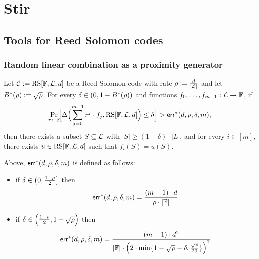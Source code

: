 
\section{Stir}

\subsection{Tools for Reed Solomon codes}
\subsubsection{Random linear combination as a proximity generator}\label{sec:proximity_gap}

\begin{theorem}\label{thm:proximity_gap}
    Let $\mathcal{C} := \mathrm{RS}[\mathbb{F},\mathcal{L},d]$ be a Reed Solomon code with rate $\rho:=\frac{d}{|\mathcal{L}|}$ and let $B^*(\rho):=\sqrt{\rho}$. For every $\delta \in (0,1 - B^*(\rho))$ and functions $f_0,\ldots,f_{m-1} : \mathcal{L} \to \mathbb{F}$, if
    \[
    \Pr_{r\leftarrow\mathbb{F}}\!\Bigl[
      \Delta\Bigl(\sum_{j=0}^{m-1} r^j\cdot {f_j},\mathrm{RS}[\mathbb{F},\mathcal{L},d]\Bigr)
      \le \delta
    \Bigr]>\mathsf{err}^*(d,\rho,\delta,m),
    \]
    then there exists a subset $S \subseteq \mathcal{L}$ with $|S| \ge (1 - \delta)\cdot|L|$,
    and for every $i \in [m]$, there exists $u \in \mathrm{RS}[\mathbb{F},\mathcal{L},d]$ such that $f_i(S) = u(S)$.
    
    \medskip
    
    \noindent
    Above, $\mathsf{err}^*(d,\rho,\delta,m)$ is defined as follows:
    \begin{itemize}
        \item if $\delta \in \left(0,\frac{1-\rho}{2}\right]$ then
            \[
                \mathsf{err}^*(d,\rho,\delta,m)=\frac{(m-1)\cdot d}{\rho\cdot|\mathbb{F}|}
            \]
        \item if $\delta \in \Bigl(\frac{1-\rho}{2}, 1-\sqrt{\rho}\Bigr)$ then
        \[
            \mathsf{err}^*(d,\rho,\delta,m)=\frac{(m-1)\cdot {d}^2}{|\mathbb{F}|\cdot{\Bigl(2\cdot\min\{1-\sqrt{\rho}-\delta,\frac{\sqrt{\rho}}{20}\}\Bigr)}^7}
        \]
    \end{itemize}
\end{theorem}


